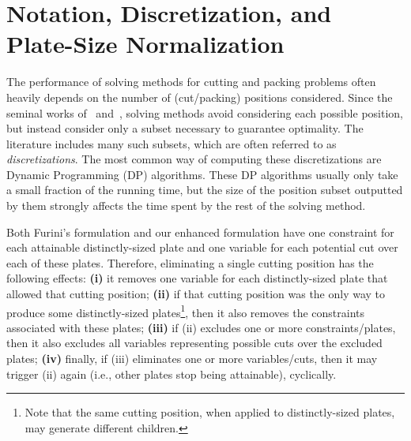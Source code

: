 \documentclass[ppgc,tese,english,formais,babel]{iiufrgs}
\begin{document}



\chapter{Notation, Discretization, and Plate-Size Normalization}
\label{sec:psn}

The performance of solving methods for cutting and packing problems often heavily depends on the number of (cut/packing) positions considered.
Since the seminal works of~\citet{cw:1977} and~\citet{herz:1972}, solving methods avoid considering each possible position, but instead consider only a subset necessary to guarantee optimality.
The literature includes many such subsets, which are often referred to as \emph{discretizations}.
The most common way of computing these discretizations are Dynamic Programming (DP) algorithms.
These DP algorithms usually only take a small fraction of the running time, but the size of the position subset outputted by them strongly affects the time spent by the rest of the solving method.

Both Furini's formulation and our enhanced formulation have one constraint for each attainable distinctly-sized plate and one variable for each potential cut over each of these plates.
Therefore, eliminating a single cutting position has the following effects:
\textbf{(i)} it removes one variable for each distinctly-sized plate that allowed that cutting position;
\textbf{(ii)} if that cutting position was the only way to produce some distinctly-sized plates\footnote{Note that the same cutting position, when applied to distinctly-sized plates, may generate different children.}, then it also removes the constraints associated with these plates;
\textbf{(iii)} if (ii) excludes one or more constraints/plates, then it also excludes all variables representing possible cuts over the excluded plates;
\textbf{(iv)} finally, if (iii) eliminates one or more variables/cuts, then it may trigger (ii) again (i.e., other plates stop being attainable), cyclically.
\end{document}
